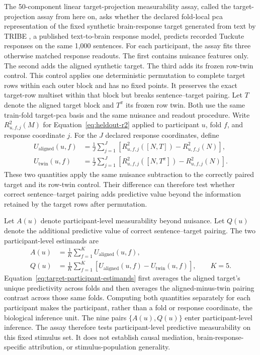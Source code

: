 The 50-component linear target-projection measurability assay, called the target-projection assay from here on, asks whether the declared fold-local \ac{pca} representation of the fixed synthetic brain-response target generated from text by TRIBE \autocite{dascoli2026}, a published text-to-brain response model, predicts recorded Tuckute responses on the same 1,000 sentences.
For each participant, the assay fits three otherwise matched response readouts.
The first contains nuisance features only.
The second adds the aligned synthetic target.
The third adds its frozen row-twin control.
This control applies one deterministic permutation to complete target rows within each outer block and has no fixed points.
It preserves the exact target-row multiset within that block but breaks sentence--target pairing.
Let \(T\) denote the aligned target block and \(T^\pi\) its frozen row twin.
Both use the same train-fold target-\ac{pca} basis and the same nuisance and readout procedure.
Write \(R_{u,f,j}^2(M)\) for Equation~\ref{eq:heldout-r2} applied to participant \(u\), fold \(f\), and response coordinate \(j\).
For the \(J\) declared response coordinates, define
\begin{equation}
\begin{aligned}
U_{\mathrm{aligned}}(u,f)
&=
\frac{1}{J}\sum_{j=1}^{J}
\left[R_{u,f,j}^2([N,T])-R_{u,f,j}^2(N)\right],
\\
U_{\mathrm{twin}}(u,f)
&=
\frac{1}{J}\sum_{j=1}^{J}
\left[R_{u,f,j}^2([N,T^\pi])-R_{u,f,j}^2(N)\right].
\end{aligned}
\label{eq:target-fold-contrasts}
\end{equation}
These two quantities apply the same nuisance subtraction to the correctly paired target and its row-twin control.
Their difference can therefore test whether correct sentence--target pairing adds predictive value beyond the information retained by the target rows after permutation.

Let \(A(u)\) denote participant-level measurability beyond nuisance.
Let \(Q(u)\) denote the additional predictive value of correct sentence--target pairing.
The two participant-level estimands are
\begin{equation}
\begin{aligned}
A(u)
&=
\frac{1}{K}\sum_{f=1}^{K}U_{\mathrm{aligned}}(u,f),
\\
Q(u)
&=
\frac{1}{K}\sum_{f=1}^{K}
\left[U_{\mathrm{aligned}}(u,f)-U_{\mathrm{twin}}(u,f)\right],
\qquad K=5.
\end{aligned}
\label{eq:target-participant-estimands}
\end{equation}
Equation~\ref{eq:target-participant-estimands} first averages the aligned target's unique predictivity across folds and then averages the aligned-minus-twin pairing contrast across those same folds.
Computing both quantities separately for each participant makes the participant, rather than a fold or response coordinate, the biological inference unit.
The nine pairs \(\{A(u),Q(u)\}\) enter participant-level inference.
The assay therefore tests participant-level predictive measurability on this fixed stimulus set.
It does not establish causal mediation, brain-response-specific attribution, or stimulus-population generality.

